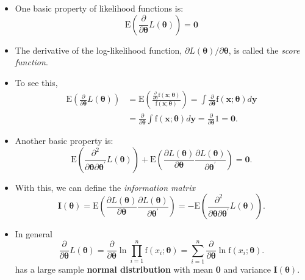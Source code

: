 \documentclass[]{book}
\theoremstyle{definition}
\theoremstyle{definition}
\theoremstyle{definition}
\theoremstyle{remark}
\begin{document}
\begin{itemize}
\item
  One basic property of likelihood functions is: \[\label{E11:ScoreZero}
  \mathrm{E} \left( \frac{ \partial}{\partial \boldsymbol \theta}
  L(\boldsymbol \theta) \right) = \mathbf 0\]
\item
  The derivative of the log-likelihood function,
  \(\partial L(\boldsymbol \theta)/\partial \boldsymbol \theta\), is
  called the \emph{score function}.
\item
  To see this, \[\begin{aligned}
  \mathrm{E} \left( \frac{ \partial}{\partial \boldsymbol \theta} L(\boldsymbol \theta) \right)
  &= \mathrm{E} \left( \frac{\frac{\partial}{\partial \boldsymbol \theta}\mathrm{f}(\mathbf{x};\boldsymbol \theta)}{\mathrm{f}(\mathbf{x};\boldsymbol \theta )}  \right)
  = \int\frac{\partial}{\partial \boldsymbol \theta} \mathrm{f}(\mathbf{x};\boldsymbol \theta ) d \mathbf y \\
  &= \frac{\partial}{\partial \boldsymbol \theta} \int \mathrm{f}(\mathbf{x};\boldsymbol \theta ) d \mathbf y
  = \frac{\partial}{\partial \boldsymbol \theta} 1 = \mathbf 0.\end{aligned}\]
\item
  Another basic property is: \[
  \mathrm{E} \left( \frac{ \partial^2}{\partial \boldsymbol \theta
  \partial \boldsymbol \theta^{\prime}} L(\boldsymbol \theta) \right)
  + \mathrm{E} \left( \frac{ \partial L(\boldsymbol \theta)}{\partial
  \boldsymbol \theta} \frac{ \partial L(\boldsymbol \theta)}{\partial
  \boldsymbol \theta^{\prime}}
   \right) = \mathbf 0.\]
\item
  With this, we can define the \emph{information matrix} \[
  \mathbf{I}(\boldsymbol \theta) = \mathrm{E} \left( \frac{ \partial
  L(\boldsymbol \theta)}{\partial \boldsymbol \theta} \frac{ \partial
  L(\boldsymbol \theta)}{\partial \boldsymbol \theta^{\prime}}
   \right) = -\mathrm{E} \left( \frac{ \partial^2}{\partial \boldsymbol \theta
  \partial \boldsymbol \theta^{\prime}} L(\boldsymbol \theta) \right).\]
\item
  In general
  \[\frac{ \partial}{\partial \boldsymbol \theta} L(\boldsymbol \theta)
  =\frac{ \partial}{\partial \boldsymbol \theta} \ln \prod_{i=1}^n
  \mathrm{f}(x_i;\boldsymbol \theta ) =\sum_{i=1}^n \frac{
  \partial}{\partial \boldsymbol \theta}
  \ln \mathrm{f}(x_i;\boldsymbol \theta ).\] has a large sample
  \textbf{normal distribution} with mean \textbf{0} and variance
  \(\mathbf{I}(\boldsymbol \theta)\).
\end{itemize}
\end{document}

